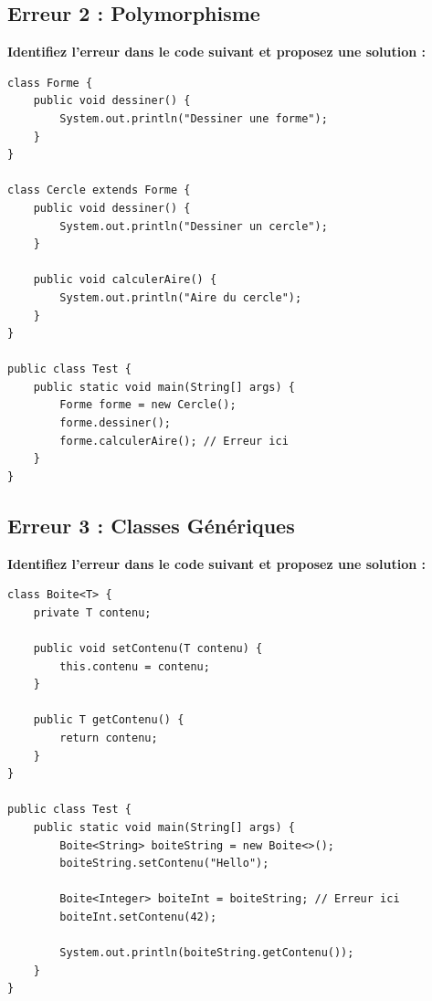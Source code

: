 \documentclass[11pt,a4paper]{article}
\begin{document}
\subsection{Erreur 2 : Polymorphisme}

\textbf{Identifiez l'erreur dans le code suivant et proposez une solution :}

\begin{lstlisting}
class Forme {
    public void dessiner() {
        System.out.println("Dessiner une forme");
    }
}

class Cercle extends Forme {
    public void dessiner() {
        System.out.println("Dessiner un cercle");
    }
    
    public void calculerAire() {
        System.out.println("Aire du cercle");
    }
}

public class Test {
    public static void main(String[] args) {
        Forme forme = new Cercle();
        forme.dessiner();
        forme.calculerAire(); // Erreur ici
    }
}
\end{lstlisting}

\begin{reponsebox}
\vspace{5cm}
\end{reponsebox}

\subsection{Erreur 3 : Classes Génériques}

\textbf{Identifiez l'erreur dans le code suivant et proposez une solution :}

\begin{lstlisting}
class Boite<T> {
    private T contenu;
    
    public void setContenu(T contenu) {
        this.contenu = contenu;
    }
    
    public T getContenu() {
        return contenu;
    }
}

public class Test {
    public static void main(String[] args) {
        Boite<String> boiteString = new Boite<>();
        boiteString.setContenu("Hello");
        
        Boite<Integer> boiteInt = boiteString; // Erreur ici
        boiteInt.setContenu(42);
        
        System.out.println(boiteString.getContenu());
    }
}
\end{lstlisting}

\begin{reponsebox}
\vspace{5cm}
\end{reponsebox}
\end{document}
